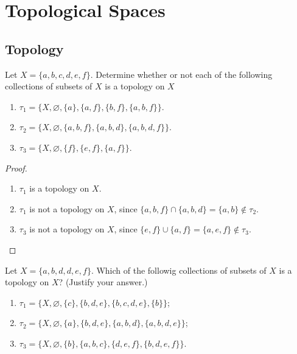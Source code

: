 \chapter{Topological Spaces}

\section{Topology}

\begin{exercise}
	Let $X = \{ a, b, c, d, e, f \}$. Determine whether or not each of the following collections of subsets of $X$ is a topology on $X$
	\begin{enumerate}[label={(\alph*)}]
		\item $\tau_{1} = \{ X, \varnothing, \{ a \}, \{ a, f \}, \{ b, f \}, \{ a, b, f \} \}$.
		\item $\tau_{2} = \{ X, \varnothing, \{ a, b, f \}, \{ a, b, d \}, \{ a, b, d, f \} \}$.
		\item $\tau_{3} = \{ X, \varnothing, \{ f \}, \{ e, f \}, \{ a, f \} \}$.
	\end{enumerate}
\end{exercise}

\begin{proof}
	\begin{enumerate}[label={(\alph*)}]
		\item $\tau_{1}$ is a topology on $X$.
		\item $\tau_{1}$ is not a topology on $X$, since $\{ a, b, f \}\cap\{ a, b, d \} = \{ a, b \}\notin \tau_{2}$.
		\item $\tau_{3}$ is not a topology on $X$, since $\{ e, f \}\cup\{ a, f \} = \{ a, e, f \}\notin \tau_{3}$.
	\end{enumerate}
\end{proof}
\newpage

\begin{exercise}
	Let $X = \{ a, b, d, d, e, f \}$. Which of the followig collections of subsets of $X$ is a topology on $X$? (Justify your answer.)
	\begin{enumerate}[label={(\alph*)}]
		\item $\tau_{1} = \{ X, \varnothing, \{ c \}, \{ b, d, e \}, \{ b, c, d, e \}, \{ b \} \}$;
		\item $\tau_{2} = \{ X, \varnothing, \{ a \}, \{ b, d, e \}, \{ a, b, d \}, \{ a, b, d, e \} \}$;
		\item $\tau_{3} = \{ X, \varnothing, \{ b \}, \{ a, b, c \}, \{ d, e, f \}, \{ b, d, e, f \} \}$.
	\end{enumerate}
\end{exercise}

